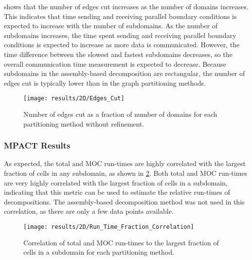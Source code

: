 {{{{         shows that the number of edges cut increases as the number of domains increases.
        This indicates that time sending and receiving parallel boundary conditions is expected to increase with the number of subdomains.
        As the number of subdomains increases, the time spent sending and receiving parallel boundary conditions is expected to increase as more data is communicated.
        However, the time difference between the slowest and fastest subdomains decreases, so the overall communication time measurement is expected to decrease.
        Because subdomains in the assembly-based decomposition are rectangular, the number of edges cut is typically lower than in the graph partitioning methods.

        \begin{figure}
          \centering
          \texttt{[image: results/2D/Edges\_Cut]}
          \caption{Number of edges cut as a fraction of number of domains for each partitioning method without refinement. \label{fig:Spatial Decomposition:2D Communication}}
        \end{figure}
      }
      \subsubsection{MPACT Results}{\label{sssec:MPACT Results}
        As expected, the total and \ac{MOC} run-times are highly correlated with the largest fraction of cells in any subdomain, as shown in \cref{fig:Spatial Decomposition:Runtime Correlation}.
        Both total and \ac{MOC} run-times are very highly correlated with the largest fraction of cells in a subdomain, indicating that this metric can be used to estimate the relative run-times of decompositions.
        The assembly-based decomposition method was not used in this correlation, as there are only a few data points available.

        \begin{figure}
          \centering
          \texttt{[image: results/2D/Run\_Time\_Fraction\_Correlation]}
          \caption{Correlation of total and \ac{MOC} run-times to the largest fraction of cells in a subdomain for each partitioning method. \label{fig:Spatial Decomposition:Runtime Correlation}}
        \end{figure}

}}}}
